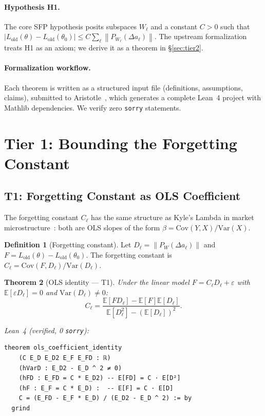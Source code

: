 \documentclass[11pt,a4paper]{article}
\newtheorem{theorem}{Theorem}[section]
\theoremstyle{definition}
\newtheorem{definition}[theorem]{Definition}
\newcommand{\E}{\mathbb{E}}
\newcommand{\Var}{\mathrm{Var}}
\newcommand{\Cov}{\mathrm{Cov}}
\newcommand{\proj}[1]{P_{#1}}
\newcommand{\norm}[1]{\left\|#1\right\|}
\newcommand{\abs}[1]{\left|#1\right|}
\begin{document}
\paragraph{Hypothesis H1.} The core SFP hypothesis posits subspaces $W_\ell$ and a constant $C > 0$ such that $\abs{L_{\mathrm{old}}(\theta) - L_{\mathrm{old}}(\theta_0)} \leq C \sum_\ell \norm{\proj{W_\ell}(\Delta a_\ell)}$. The upstream formalization treats H1 as an axiom; we derive it as a theorem in \S\ref{sec:tier2}.

\paragraph{Formalization workflow.} Each theorem is written as a structured input file (definitions, assumptions, claims), submitted to Aristotle~\citep{aristotle2025}, which generates a complete Lean~4 project with Mathlib dependencies. We verify zero \texttt{sorry} statements.

\section{Tier 1: Bounding the Forgetting Constant}
\label{sec:tier1}

\subsection{T1: Forgetting Constant as OLS Coefficient}

The forgetting constant $C_\ell$ has the same structure as Kyle's Lambda in market microstructure~\citep{kyle1985}: both are OLS slopes of the form $\beta = \Cov(Y, X) / \Var(X)$.

\begin{definition}[Forgetting constant]
\label{def:C}
Let $D_\ell = \norm{\proj{W}(\Delta a_\ell)}$ and $F = L_{\mathrm{old}}(\theta) - L_{\mathrm{old}}(\theta_0)$. The forgetting constant is $C_\ell = \Cov(F, D_\ell) / \Var(D_\ell)$.
\end{definition}

\begin{theorem}[OLS identity --- T1]
\label{thm:ols}
Under the linear model $F = C_\ell D_\ell + \varepsilon$ with $\E[\varepsilon D_\ell] = 0$ and $\Var(D_\ell) \neq 0$:
\[
C_\ell = \frac{\E[FD_\ell] - \E[F]\E[D_\ell]}{\E[D_\ell^2] - (\E[D_\ell])^2}.
\]
\end{theorem}

\noindent\textit{Lean~4 (verified, 0 \texttt{sorry}):}
\begin{lstlisting}[style=lean]
theorem ols_coefficient_identity
    (C E_D E_D2 E_F E_FD : ℝ)
    (hVarD : E_D2 - E_D ^ 2 ≠ 0)
    (hFD : E_FD = C * E_D2) -- E[FD] = C · E[D²]
    (hF : E_F = C * E_D) :  -- E[F] = C · E[D]
    C = (E_FD - E_F * E_D) / (E_D2 - E_D ^ 2) := by
  grind
\end{lstlisting}
\end{document}
